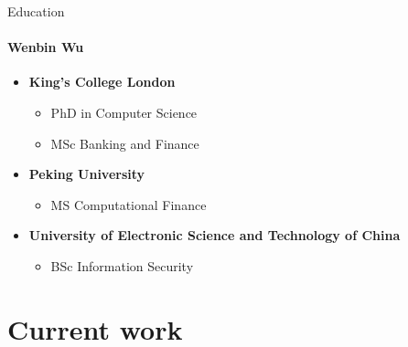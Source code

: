 \documentclass{beamer}
\begin{document}
\begin{frame}{Education}
\framesubtitle{Wenbin Wu}
\begin{itemize}
\item \textbf{King’s College London}
\begin{itemize}
\item PhD in Computer Science
\item MSc Banking and Finance
\end{itemize}

\item \textbf{Peking University}
\begin{itemize}
\item MS Computational Finance
\end{itemize}

\item \textbf{University of Electronic Science and Technology of China}
\begin{itemize}
\item BSc Information Security
\end{itemize}
\end{itemize}
\end{frame}

\section{Current work}
\end{document}
